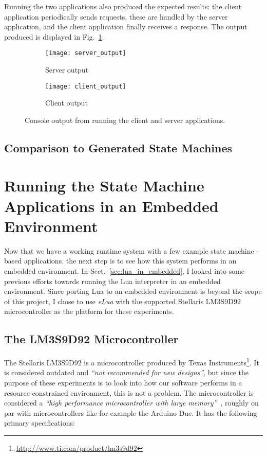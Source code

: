 Running the two applications also produced the expected results: the client application periodically sends requests, these are handled by the server application, and the client application finally receives a response. The output produced is displayed in Fig.~\ref{fig:client_server_output}.

\begin{figure}[htp]
	\centering
	\begin{subfigure}[b]{.4\textwidth}
		\texttt{[image: server\_output]}
		\caption{Server output}
	\end{subfigure}
	\quad
	\begin{subfigure}[b]{.4\textwidth}
		\texttt{[image: client\_output]}
		\caption{Client output}
	\end{subfigure}
	\caption[Output of Client - Server test run (desktop)]{Console output from running the client and server applications.}
	\label{fig:client_server_output}
\end{figure}

\FloatBarrier
\subsection{Comparison to Generated State Machines}



\section{Running the State Machine Applications in an Embedded Environment}
\label{sec:running_on_micro}
Now that we have a working runtime system with a few example state machine -based applications, the next step is to see how this system performs in an embedded environment. In Sect.~\ref{sec:lua_in_embedded}, I looked into some previous efforts towards running the Lua interpreter in an embedded environment. Since porting Lua to an embedded environment is beyond the scope of this project, I chose to use \emph{eLua} with the supported Stellaris LM3S9D92 microcontroller as the platform for these experiments.

\subsection{The LM3S9D92 Microcontroller}
\label{sec:microcontroller}
The Stellaris LM3S9D92 is a microcontroller produced by Texas Instruments\footnote{\url{http://www.ti.com/product/lm3s9d92}}. It is considered outdated and \emph{``not recommended for new designs''}, but since the purpose of these experiments is to look into how our software performs in a resource-constrained environment, this is not a problem. The microcontroller is considered a \emph{``high performance microcontroller with large memory''}~\cite{website:stellaris_micro}, roughly on par with microcontrollers like for example the Arduino Due. It has the following primary specifications:


